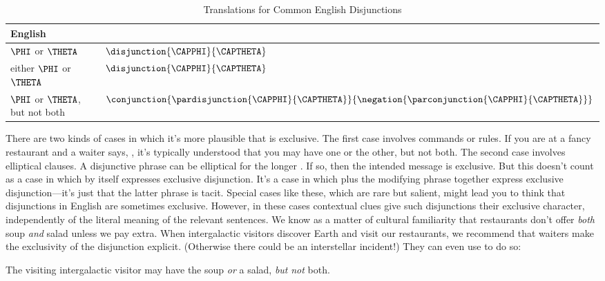  	\begin{table}
 		\renewcommand{\arraystretch}{1.5}%
 		\begin{center}
 			\begin{tabular}{ l l } %
 				\toprule
 				\textbf{English} & \textbf{\GSL{}} \\ 
 				\midrule
 				$\PHI$ or $\THETA$ & $\disjunction{\CAPPHI}{\CAPTHETA}$ \\
 				either $\PHI$ or $\THETA$ & $\disjunction{\CAPPHI}{\CAPTHETA}$ \\
 				$\PHI$ or $\THETA$, but not both & $\conjunction{\pardisjunction{\CAPPHI}{\CAPTHETA}}{\negation{\parconjunction{\CAPPHI}{\CAPTHETA}}}$ \\
 				\bottomrule
 			\end{tabular} 
 			\caption{Translations for Common English Disjunctions}
 			\label{TransTableC} 
 		\end{center}
 	\end{table}
 	
  	There are two kinds of cases in which it's more plausible that  is exclusive.  
 	The first case involves commands or rules. 
 	If you are at a fancy restaurant and a waiter says, , it's typically understood that you may have one or the other, but not both. The second case involves elliptical clauses. 
 	A disjunctive phrase  can be elliptical for the longer . 
 	If so, then the intended message is exclusive. 
 	But this doesn't count as a case in which  by itself expresses exclusive disjunction. 
 	It's a case in which  plus the modifying phrase  together express exclusive disjunction---it's just that the latter phrase  is tacit. 
 	Special cases like these, which are rare but salient, might lead you to think that disjunctions in English are sometimes exclusive.  However, in these cases contextual clues give such disjunctions their exclusive character, independently of the literal meaning of the relevant sentences.  We know as a matter of cultural familiarity that restaurants don't offer \emph{both} soup \emph{and} salad unless we pay extra.  When intergalactic visitors discover Earth and visit our restaurants, we recommend that waiters make the exclusivity of the disjunction explicit.  (Otherwise there could be an interstellar incident!)  They can even use \GSL{} to do so:
 	
 \begin{menumerate}
 	\item The visiting intergalactic visitor may have the soup \emph{or} a salad, \emph{but} \emph{not} both.
 \end{menumerate}
 	
